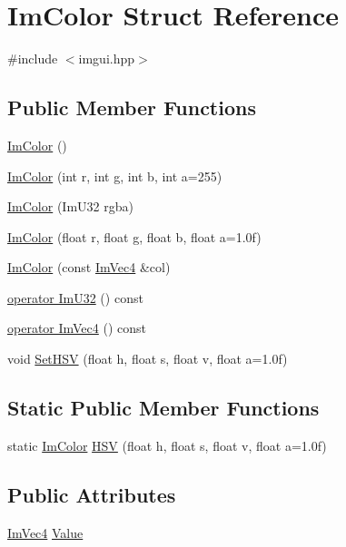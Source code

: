 \hypertarget{struct_im_color}{}\section{Im\+Color Struct Reference}
\label{struct_im_color}


{\ttfamily \#include $<$imgui.\+hpp$>$}

\subsection*{Public Member Functions}
\begin{DoxyCompactItemize}
\item 
\hyperlink{struct_im_color_a95206b688dcc03f725790538c74f4526}{Im\+Color} ()
\item 
\hyperlink{struct_im_color_ab4ba02f8290d5dadc1ebc57b2c8a9cbe}{Im\+Color} (int r, int g, int b, int a=255)
\item 
\hyperlink{struct_im_color_ad306332841a2b1f903f40262a19f9412}{Im\+Color} (Im\+U32 rgba)
\item 
\hyperlink{struct_im_color_a92b53917ca9d90a7207b18270ff5453d}{Im\+Color} (float r, float g, float b, float a=1.\+0f)
\item 
\hyperlink{struct_im_color_aa5306926b3ef766a8647b26bdfd9f8d2}{Im\+Color} (const \hyperlink{struct_im_vec4}{Im\+Vec4} \&col)
\item 
\hyperlink{struct_im_color_a4f4fc53e0676d50404d6d5ffcf16637f}{operator Im\+U32} () const
\item 
\hyperlink{struct_im_color_a10f1de242f13c93f8be64545e4cbcb0a}{operator Im\+Vec4} () const
\item 
void \hyperlink{struct_im_color_afcff20160db703b956d56e5a9fa88e24}{Set\+H\+SV} (float h, float s, float v, float a=1.\+0f)
\end{DoxyCompactItemize}
\subsection*{Static Public Member Functions}
\begin{DoxyCompactItemize}
\item 
static \hyperlink{struct_im_color}{Im\+Color} \hyperlink{struct_im_color_ac8cb52119648523038818a613becf010}{H\+SV} (float h, float s, float v, float a=1.\+0f)
\end{DoxyCompactItemize}
\subsection*{Public Attributes}
\begin{DoxyCompactItemize}
\item 
\hyperlink{struct_im_vec4}{Im\+Vec4} \hyperlink{struct_im_color_a4cf43bd58e30decaa0248f839fc85e95}{Value}
\end{DoxyCompactItemize}


